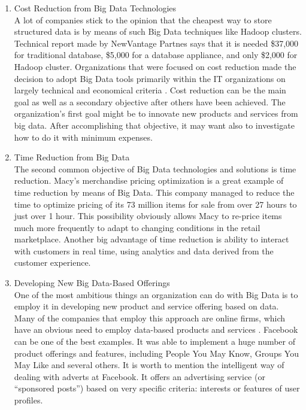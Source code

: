 \documentclass[runningheads]{llncs}
\begin{document}
\begin{enumerate}
\item Cost Reduction from Big Data Technologies\\

A lot of companies stick to the opinion that the cheapest way to store structured data is by means of such Big Data techniques like Hadoop clusters. Technical report \cite{NEWVANTAGE} made by NewVantage Partnes says that it is needed \$37,000 for traditional database, \$5,000 for a database appliance, and only \$2,000 for Hadoop cluster. Organizations that were focused on cost reduction made the decision to adopt Big Data tools primarily within the IT organizations on largely technical and economical criteria \cite{DAVENPORT}. Cost reduction can be the main goal as well as a secondary objective after others have been achieved. The organization's first goal might be to innovate new products and services from big data. After accomplishing that objective, it may want also to investigate how to do it with minimum expenses.\\

\item Time Reduction from Big Data\\

The second common objective of Big Data technologies and solutions is time reduction. Macy's merchandise pricing optimization is a great example of time reduction by means of Big Data. This company managed to reduce the time to optimize pricing of its 73 million items for sale from over 27 hours to just over 1 hour. This possibility obviously allows Macy to re-price items much more frequently to adapt to changing conditions in the retail marketplace\cite{DAVENPORT}. Another big advantage of time reduction is ability to interact with customers in real time, using analytics and data derived from the customer experience.\\

\item Developing New Big Data-Based Offerings\\

One of the most ambitious things an organization can do with Big Data is to employ it in developing new product and service offering based on data. Many of the companies that employ this approach are online firms, which have an obvious need to employ data-based products and services \cite{DAVENPORT}. Facebook can be one of the best examples. It was able to implement a huge number of product offerings and features, including People You May Know, Groups You May Like and several others. It is worth to mention the intelligent way of dealing with adverts at Facebook. It offers an advertising service (or “sponsored posts”) based on very specific criteria: interests or features of user profiles. 


\end{enumerate}
\end{document}
